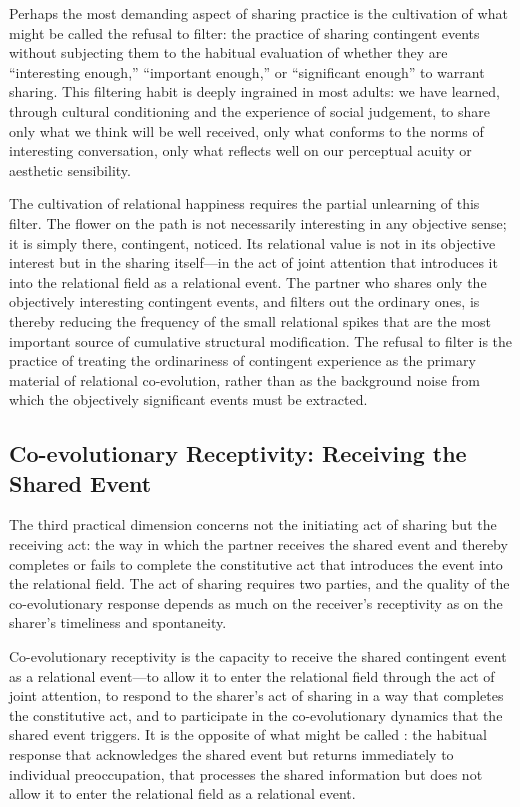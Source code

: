  Perhaps the most demanding aspect of sharing practice is the cultivation of what might be called the refusal to filter: the practice of sharing contingent events without subjecting them to the habitual evaluation of whether they are ``interesting enough,'' ``important enough,'' or ``significant enough'' to warrant sharing. This filtering habit is deeply ingrained in most adults: we have learned, through cultural conditioning and the experience of social judgement, to share only what we think will be well received, only what conforms to the norms of interesting conversation, only what reflects well on our perceptual acuity or aesthetic sensibility.

The cultivation of relational happiness requires the partial unlearning of this filter. The flower on the path is not necessarily interesting in any objective sense; it is simply there, contingent, noticed. Its relational value is not in its objective interest but in the sharing itself---in the act of joint attention that introduces it into the relational field as a relational event. The partner who shares only the objectively interesting contingent events, and filters out the ordinary ones, is thereby reducing the frequency of the small relational spikes that are the most important source of cumulative structural modification. The refusal to filter is the practice of treating the ordinariness of contingent experience as the primary material of relational co-evolution, rather than as the background noise from which the objectively significant events must be extracted.

\subsection{Co-evolutionary Receptivity: Receiving the Shared Event}
\label{p14:subsec:receptivity}

\noindent
The third practical dimension concerns not the initiating act of sharing but the receiving act: the way in which the partner receives the shared event and thereby completes or fails to complete the constitutive act that introduces the event into the relational field. The act of sharing requires two parties, and the quality of the co-evolutionary response depends as much on the receiver's receptivity as on the sharer's timeliness and spontaneity.

Co-evolutionary receptivity is the capacity to receive the shared contingent event as a relational event---to allow it to enter the relational field through the act of joint attention, to respond to the sharer's act of sharing in a way that completes the constitutive act, and to participate in the co-evolutionary dynamics that the shared event triggers. It is the opposite of what might be called : the habitual response that acknowledges the shared event but returns immediately to individual preoccupation, that processes the shared information but does not allow it to enter the relational field as a relational event.

